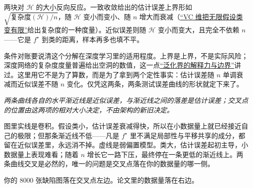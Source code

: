 两块对 \(\mathcal{H}\) 的大小反向反应。一致收敛给出的估计误差上界形如 \(\sqrt{\text{复杂度}(\mathcal H)/n}\)，随 \(\mathcal H\) 变小而变小、随 \(n\) 增大而衰减（\hyperref[sec:13-Machine-Learning/10-Learning-Theory/03]{``VC 维把无限假设类变有限''}给出复杂度的一种度量）。近似误差则随 \(\mathcal H\) 变小而变大，且完全不依赖 \(n\)——它是 \(f^\star\) 到类的距离，样本再多也填不平。

条件对账要说清这个分解在深度学习里的适用程度。上界是上界，不是实际风险；深度网络的复杂度度量普遍给出空洞的数值，这一点\hyperref[sec:13-Machine-Learning/10-Learning-Theory/04]{``泛化界的解释力与边界''}讲过。这里用它不是为了算数，而是为了拿到两个定性事实：估计误差随 \(n\) 单调衰减而近似误差不随 \(n\) 变化。仅凭这两条，两条测试误差曲线的形状就定下来了。

\begin{center}
\end{center}

\emph{两条曲线各自的水平渐近线是近似误差，与渐近线之间的落差是估计误差；交叉点的位置由这两项的相对大小决定，不由架构的新旧决定。}

图里实线是卷积。假设类小，估计误差衰减得快，所以在小数据量上就已经接近自己的极限；但那条渐近线不低——凡是 \(f^\star\) 里不满足局部性与平移共享的成分，都留在近似误差里，永远消不掉。虚线是弱偏置模型。类大，估计误差起初主导，小数据量上表现难看；随着 \(n\) 增长它一路下压，最终停在一条更低的渐近线上。两条曲线交叉是必然的，唯一的问题是交叉点落在你的数据量的哪一侧。

你的 8000 张缺陷图落在交叉点左边。论文里的数据量落在右边。

